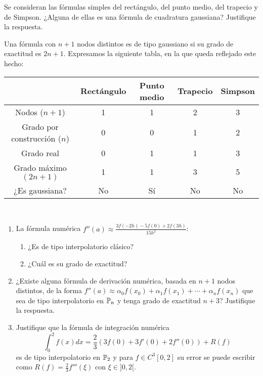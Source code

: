 \begin{ejercicio}\label{ej:2.1.21}
    Se consideran las fórmulas simples del rectángulo, del punto medio, del trapecio y de Simpson. ¿Alguna de ellas es una fórmula de cuadratura gaussiana? Justifique la respuesta.

    Una fórmula con $n+1$ nodos distintos es de tipo gaussiano si su grado de exactitud es $2n+1$. Expresamos la siguiente tabla, en la que queda reflejado este hecho:
    \begin{center}
        \begin{tabular}{c|c|c|c|c}
            & Rectángulo & Punto medio & Trapecio & Simpson \\
            \hline
            Nodos ($n+1$) & 1 & 1 & 2 & 3 \\
            Grado por construcción ($n$) & 0 & 0 & 1 & 2 \\
            Grado real & 0 & 1 & 1 & 3 \\
            Grado máximo $(2n+1)$ & 1 & 1 & 3 & 5 \\
            ¿Es gaussiana? & No & Sí & No & No
        \end{tabular}
    \end{center}
\end{ejercicio}

\begin{ejercicio}\label{ej:2.1.22}~
    \begin{enumerate}
        \item La fórmula numérica $f''(a) \approx \frac{3f(-2h) - 5f(0) + 2f(3h)}{15h^2}$:
        \begin{enumerate}
            \item ¿Es de tipo interpolatorio clásico?
            \item ¿Cuál es su grado de exactitud?
        \end{enumerate}
        \item ¿Existe alguna fórmula de derivación numérica, basada en $n + 1$ nodos distintos, de la forma $f''(a) \approx \alpha_0 f(x_0) + \alpha_1 f(x_1) + \cdots + \alpha_n f(x_n)$ que sea de tipo interpolatorio en $\mathbb{P}_n$ y tenga grado de exactitud $n + 3$? Justifique la respuesta.
        \item Justifique que la fórmula de integración numérica $$\int_{0}^{2} f(x) dx = \frac{2}{3} (3f(0) + 3f'(0) + 2f''(0)) + R(f)$$ es de tipo interpolatorio en $\mathbb{P}_2$ y para $f \in C^3[0, 2]$ su error se puede escribir como $R(f) = \frac{2}{3} f'''(\xi)$ con $\xi \in ]0, 2[$.
    \end{enumerate}
\end{ejercicio}

